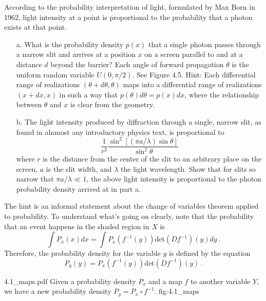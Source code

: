 

According to the probability interpretation of light, formulated by Max Born in 1962, light intensity at a point is proportional to the probability that a photon exists at that point.
\begin{itemize}
  \item[a.] What is the probability density $p(x)$ that a single photon passes through a narrow slit and arrives at a position $x$ on a screen parallel to and at a distance $d$ beyond the barrier?
    Each angle of forward propagation $\theta$ is the uniform random variable $U(0, \pi/2)$.
    See Figure 4.5.
    Hint: Each differential range of realizations $(\theta + d\theta, \theta)$ maps into a differential range of realizations $(x+dx, x)$ in such a way that $p(\theta)d\theta = p(x)dx$, where the relationship between $\theta$ and $x$ is clear from the geometry.
  \item[b.] The light intensity produced by diffraction through a single, narrow slit, as found in alnmost any introductory physics text, is proportional to
    \begin{displaymath}
      \frac{1}{r^2} \frac{\sin^2 \left[ (\pi a / \lambda) \sin \theta \right]}{\sin^2 \theta}
    \end{displaymath}
    where $r$ is the distance from the center of the slit to an arbitrary place on the screen, $a$ is the slit width, and $\lambda$ the light wavelength.
    Show that for slits so narrow that $\pi a / \lambda \ll 1$, the above light intensity is proportional to the photon probability density arrived at in part a.
\end{itemize}


The hint is an informal statement about the change of variables theorem applied to probability.
To understand what's going on clearly, note that the probability that an event happens in the shaded region in $X$ is
\begin{displaymath}
  \int P_x(x) dx = \int P_x(f^{-1}(y)) \text{det}(Df^{-1})(y) dy \, .
\end{displaymath}
Therefore, the probability density for the variable $y$ is defined by the equation
\begin{displaymath}
  P_y(y) = P_x(f^{-1}(y)) \text{det}(Df^{-1})(y) \, .
\end{displaymath}

{{4.1_maps}.pdf}
{Given a probability density $P_x$ and a map $f$ to another variable $Y$, we have a new probability density $P_y = P_x \circ f^{-1}$.}
{fig:4.1_maps}

